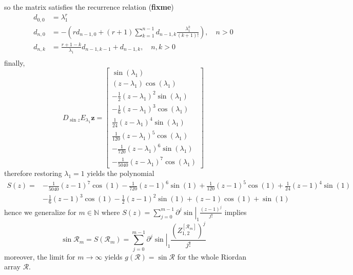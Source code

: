 so the matrix satisfies the recurrence relation (\textbf{fixme})
\begin{displaymath}
\begin{split}
d_{0,0}&=\lambda_{1}^{r}\\
d_{n,0}&=-\left(r d_{n-1, 0} + (r+1)\sum_{k=1}^{n-1}{d_{n-1, k}\frac{\lambda_{1}^{k}}{(k+1)!}}\right), \quad n>0 \\
d_{n,k}&=\frac{r+1-k}{\lambda_{1}}d_{n-1, k-1} + d_{n-1,k}, \quad n,k > 0\\
\end{split}
\end{displaymath}
finally,
\begin{displaymath}
D_{\sin{z}}E_{\lambda_{1}}\boldsymbol{z} = \left[\begin{matrix}\sin{\left (\lambda_{1} \right )}\\\left(z - \lambda_{1}\right) \cos{\left (\lambda_{1} \right )}\\- \frac{1}{2} \left(z - \lambda_{1}\right)^{2} \sin{\left (\lambda_{1} \right )}\\- \frac{1}{6} \left(z - \lambda_{1}\right)^{3} \cos{\left (\lambda_{1} \right )}\\\frac{1}{24} \left(z - \lambda_{1}\right)^{4} \sin{\left (\lambda_{1} \right )}\\\frac{1}{120} \left(z - \lambda_{1}\right)^{5} \cos{\left (\lambda_{1} \right )}\\- \frac{1}{720} \left(z - \lambda_{1}\right)^{6} \sin{\left (\lambda_{1} \right )}\\- \frac{1}{5040} \left(z - \lambda_{1}\right)^{7} \cos{\left (\lambda_{1} \right )}\end{matrix}\right]
\end{displaymath}
therefore restoring $\lambda_{1}=1$ yields the polynomial
\begin{displaymath}
\begin{split}
S{\left (z \right )} = &- \frac{1}{5040} \left(z - 1\right)^{7} \cos{\left (1 \right )} - \frac{1}{720} \left(z - 1\right)^{6} \sin{\left (1 \right )} + \frac{1}{120} \left(z - 1\right)^{5} \cos{\left (1 \right )} + \frac{1}{24} \left(z - 1\right)^{4} \sin{\left (1 \right )} \\
                       &- \frac{1}{6} \left(z - 1\right)^{3} \cos{\left (1 \right )} - \frac{1}{2} \left(z - 1\right)^{2} \sin{\left (1 \right )} + \left(z - 1\right) \cos{\left (1 \right )} + \sin{\left (1 \right )}
\end{split}
\end{displaymath}
hence we generalize for $m\in\mathbb{N}$ where $S(z) = \sum_{j=0}^{m-1}{\left.{\partial^{j} \sin}\right|_{1} \frac{(z-1)^{j}}{j!}}$ implies
\begin{displaymath}
\sin{\mathcal{R}_{m}} = S{\left (\mathcal{R}_{m} \right )} = \sum_{j=0}^{m-1}{\left.{\partial^{j} \sin}\right|_{1} \frac{{\left(Z_{1,2}^{\left[\mathcal{R}_{m}\right]}\right)}^{j}}{j!}}
\end{displaymath}
moreover, the limit for $m \rightarrow \infty$ yields $ g{\left (\mathcal{R}
\right )} = \sin{\mathcal{R}} $ for the whole Riordan array $\mathcal{R}$.
\fi
